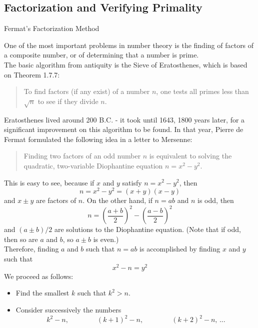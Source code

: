 \documentclass[smaller,hyperref={CJKbookmarks=true}]{beamer}
\begin{document}
\subsection{Factorization and Verifying Primality}
\begin{frame}[c] \begin{spacing}{2}
\tableofcontents[sectionstyle=hide,subsectionstyle=show/shaded/hide]
\end{spacing}
\end{frame}
\begin{frame}{Fermat's Factorization Method}
\begin{spacing}{1.1}
One of the most important problems in number theory is the finding of
factors of a composite number, or of determining that a number is prime.\\[5pt]
The basic algorithm from antiquity is the Sieve of Eratosthenes, which is
based on Theorem 1.7.7:\\[5pt]
\begin{quote}
To find factors (if any exist) of a number $n$, one tests all primes less than $\sqrt{n}$ to see if they divide $n$.
\end{quote}
Eratosthenes lived around 200 B.C. - it took until 1643, 1800 years later,
for a significant improvement on this algorithm to be found. In that year,
Pierre de Fermat formulated the following idea in a letter to Mersenne:\\[4pt]
\begin{quote}
Finding two factors of an odd number $n$ is equivalent to solving the quadratic, two-variable Diophantine equation $n=x^2-y^2$.
\end{quote}
\newpage
This is easy to see, because if $x$ and $y$ satisfy $n=x^2-y^2$, then
\[n=x^2-y^2=(x+y)(x-y)\]
and $x\pm y$ are factors of $n$. On the other hand, if $n=ab$ and $n$ is odd, then
\[n=\left(\frac{a+b}{2}\right)^2-\left(\frac{a-b}{2}\right)^2\]
and $(a\pm b)/2$ are solutions to the Diophantine equation. (Note that if odd, then so are $a$ and $b$, so $a\pm b$ is even.)\\[5pt]
Therefore, finding $a$ and $b$ such that $n=ab$ is accomplished by finding $x$ and $y$ such that
\[x^2-n=y^2\]
\newpage
We proceed as follows:
\begin{itemize}
  \item Find the smallest $k$ such that $k^2>n$.
  \item Consider successively the numbers
      \[k^2-n,\qquad\qquad (k+1)^2-n,\qquad\qquad
      (k+2)^2-n,\,...\]

\end{itemize}
\end{spacing}
\end{frame}
\end{document}
